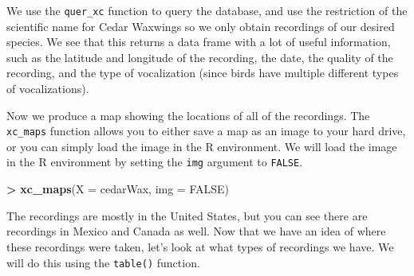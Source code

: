 \documentclass[]{krantz}
\makeatletter
\newenvironment{Shaded}{\begin{snugshade}}{\end{snugshade}}
\newcommand{\DataTypeTok}[1]{\textcolor[rgb]{0.27,0.27,0.27}{#1}}
\newcommand{\KeywordTok}[1]{\textcolor[rgb]{0.27,0.27,0.27}{\textbf{#1}}}
\newcommand{\NormalTok}[1]{#1}
\newcommand{\OperatorTok}[1]{\textcolor[rgb]{0.43,0.43,0.43}{\textbf{#1}}}
\newcommand{\OtherTok}[1]{\textcolor[rgb]{0.37,0.37,0.37}{#1}}
\newcommand{\StringTok}[1]{\textcolor[rgb]{0.5,0.5,0.5}{#1}}
\newenvironment{kframe}{%
\medskip{}
\setlength{\fboxsep}{.8em}
 \def\at@end@of@kframe{}%
 \ifinner\ifhmode%
  \def\at@end@of@kframe{\end{minipage}}%
  \begin{minipage}{\columnwidth}%
 \fi\fi%
 \def\FrameCommand##1{\hskip\@totalleftmargin \hskip-\fboxsep
 \colorbox{shadecolor}{##1}\hskip-\fboxsep
     \hskip-\linewidth \hskip-\@totalleftmargin \hskip\columnwidth}%
 \MakeFramed {\advance\hsize-\width
   \@totalleftmargin\z@ \linewidth\hsize
   \@setminipage}}%
 {\par\unskip\endMakeFramed%
 \at@end@of@kframe}
\renewenvironment{Shaded}{\begin{kframe}}{\end{kframe}}
\makeatother
\begin{document}
We use the \texttt{quer\_xc} function to query the database, and use the restriction of the scientific name for Cedar Waxwings so we only obtain recordings of our desired species. We see that this returns a data frame with a lot of useful information, such as the latitude and longitude of the recording, the date, the quality of the recording, and the type of vocalization (since birds have multiple different types of vocalizations).

Now we produce a map showing the locations of all of the recordings. The \texttt{xc\_maps} function allows you to either save a map as an image to your hard drive, or you can simply load the image in the R environment. We will load the image in the R environment by setting the \texttt{img} argument to \texttt{FALSE}.

\begin{Shaded}
\begin{Highlighting}[]
\OperatorTok{>}\StringTok{ }\KeywordTok{xc_maps}\NormalTok{(}\DataTypeTok{X =}\NormalTok{ cedarWax, }\DataTypeTok{img =} \OtherTok{FALSE}\NormalTok{)}
\end{Highlighting}
\end{Shaded}

The recordings are mostly in the United States, but you can see there are recordings in Mexico and Canada as well. Now that we have an idea of where these recordings were taken, let's look at what types of recordings we have. We will do this using the \texttt{table()} function.

\begin{Shaded}
\end{Shaded}
\end{document}
